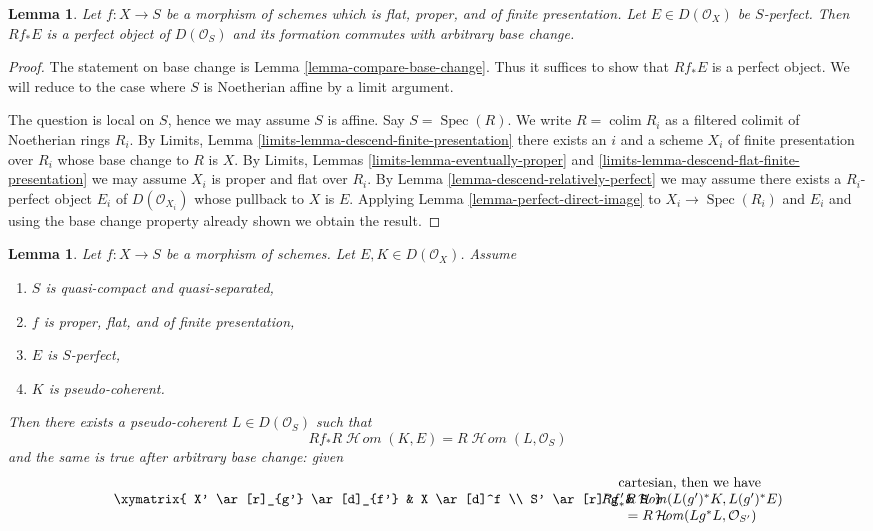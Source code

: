 \documentclass{stacks-project}
\theoremstyle{plain}
\newtheorem{lemma}[subsection]{Lemma}
\theoremstyle{definition}
\theoremstyle{remark}
\numberwithin{equation}{subsection}
\def\colim{\mathop{\mathrm{colim}}\nolimits}
\def\Spec{\mathop{\mathrm{Spec}}}
\def\SheafHom{\mathop{\mathcal{H}\!\mathit{om}}\nolimits}
\begin{document}
\begin{lemma}
\label{lemma-derived-pushforward-rel-perfect}
Let $f : X \to S$ be a morphism of schemes which is flat, proper, and
of finite presentation. Let $E \in D(\mathcal{O}_X)$ be $S$-perfect.
Then $Rf_*E$ is a perfect object of $D(\mathcal{O}_S)$
and its formation commutes with arbitrary base change.
\end{lemma}

\begin{proof}
The statement on base change is Lemma \ref{lemma-compare-base-change}.
Thus it suffices to show that $Rf_*E$ is a perfect object. We will reduce
to the case where $S$ is Noetherian affine by a limit argument.

\medskip\noindent
The question is local on $S$, hence we may assume $S$ is affine.
Say $S = \Spec(R)$. We write $R = \colim R_i$ as a filtered colimit
of Noetherian rings $R_i$. By Limits, Lemma
\ref{limits-lemma-descend-finite-presentation}
there exists an $i$ and a scheme $X_i$ of finite presentation over $R_i$
whose base change to $R$ is $X$. By
Limits, Lemmas \ref{limits-lemma-eventually-proper} and
\ref{limits-lemma-descend-flat-finite-presentation}
we may assume $X_i$ is proper and flat over $R_i$.
By Lemma \ref{lemma-descend-relatively-perfect}
we may assume there exists a $R_i$-perfect object $E_i$ of
$D(\mathcal{O}_{X_i})$ whose pullback to $X$ is $E$.
Applying Lemma \ref{lemma-perfect-direct-image}
to $X_i \to \Spec(R_i)$ and $E_i$ and using the
base change property already shown we obtain the result.
\end{proof}

\begin{lemma}
\label{lemma-compute-ext-rel-perfect}
Let $f : X \to S$ be a morphism of schemes. Let $E, K \in D(\mathcal{O}_X)$.
Assume
\begin{enumerate}
\item $S$ is quasi-compact and quasi-separated,
\item $f$ is proper, flat, and of finite presentation,
\item $E$ is $S$-perfect,
\item $K$ is pseudo-coherent.
\end{enumerate}
Then there exists a pseudo-coherent $L \in D(\mathcal{O}_S)$ such that
$$
Rf_*R\SheafHom(K, E) = R\SheafHom(L, \mathcal{O}_S)
$$
and the same is true after arbitrary base change: given
$$
\vcenter{
\xymatrix{
X' \ar[r]_{g'} \ar[d]_{f'} &
X \ar[d]^f \\
S' \ar[r]^g &
S
}
}
\quad\quad
\begin{matrix}
\text{cartesian, then we have } \\
Rf'_*R\SheafHom(L(g')^*K, L(g')^*E) \\
= R\SheafHom(Lg^*L, \mathcal{O}_{S'})
\end{matrix}
$$
\end{lemma}
\end{document}
